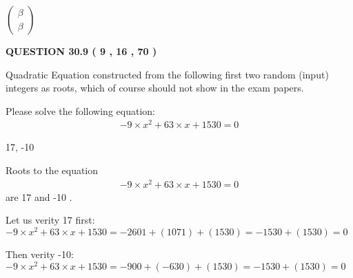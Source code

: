 \documentclass[12pt]{article}
\begin{document}
   
 $  \left( \begin{array}
 {
 c
 }
 \beta \\ 
 \beta
 \end{array} \right) $ 
  
\vspace{0.2in}
  
{\textbf{\Large{QUESTION
30.9 
 (           9 ,          16 ,          70 )
}}}
  
  


\noindent{}
Quadratic Equation constructed from the following first two random (input) integers as roots,  
which of course should not show in the exam papers.  
\noindent{}


 
 

 
Please solve the following equation:
\begin{eqnarray*}
-9 \times x^2  %
+  %
63
                 \times x    %
+  %
1530 =0
\end{eqnarray*}
 
 
 
\noindent{}
 
 

17,  %
-10
 
 
 
\noindent{}
 
 

 
 
 
\noindent{}
 
 

Roots to the equation
\begin{eqnarray*}
-9 \times x^2  %
+  %
63
                 \times x    %
+  %
1530 =0
\end{eqnarray*}
are  %
17 and  %
-10 .
 
Let us verity  %
17 first:
$  %
-9 \times x^2  %
+  %
63
                 \times x    %
+  %
1530
  = %
-2601+( %
1071)+( %
1530)
  = %
-1530+( %
1530)
  = %
0
$
 
Then verity  %
-10:
$  %
-9 \times x^2  %
+  %
63
                 \times x    %
+  %
1530
  = %
-900+( %
-630)+( %
1530)
  = %
-1530+( %
1530)
  = %
0
$
 
\end{document}
